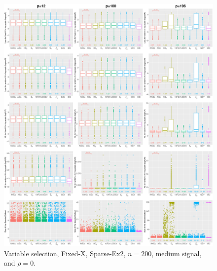 \begin{figure}[!ht]
\centering
\includegraphics[width=\textwidth]{figures/supplement/fixedx/subset_selection/Sparse-Ex2_n200_msnr_rho0.eps}
\caption{Variable selection, Fixed-X, Sparse-Ex2, $n=200$, medium signal, and $\rho=0$.}
\end{figure}
\clearpage
